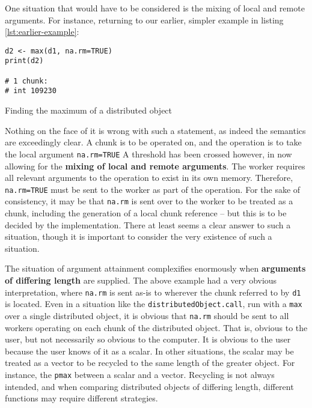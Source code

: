 One situation that would have to be considered is the mixing of local
and remote arguments. For instance, returning to our earlier, simpler
example in listing \cref{lst:earlier-example}:

\begin{listing}
    \begin{verbatim}
d2 <- max(d1, na.rm=TRUE)
print(d2)

# 1 chunk:
# int 109230
    \end{verbatim}
    \caption{Finding the maximum of a distributed object}
    \label{lst:earlier-example}
\end{listing}

Nothing on the face of it is wrong with such a statement, as indeed the
semantics are exceedingly clear. A chunk is to be operated on, and the
operation is to take the local argument \texttt{na.rm=TRUE} A threshold
has been crossed however, in now allowing for the \textbf{mixing of
    local and remote arguments}. The worker requires all relevant arguments
to the operation to exist in its own memory. Therefore,
\texttt{na.rm=TRUE} must be sent to the worker as part of the operation.
For the sake of consistency, it may be that \texttt{na.rm} is sent over
to the worker to be treated as a chunk, including the generation of a
local chunk reference -- but this is to be decided by the
implementation. There at least seems a clear answer to such a situation,
though it is important to consider the very existence of such a
situation.

The situation of argument attainment complexifies enormously when
\textbf{arguments of differing length} are supplied. The above example
had a very obvious interpretation, where \texttt{na.rm} is sent as-is to
wherever the chunk referred to by \texttt{d1} is located. Even in a
situation like the \texttt{distributedObject.call}, run with a
\texttt{max} over a single distributed object, it is obvious that
\texttt{na.rm} should be sent to all workers operating on each chunk of
the distributed object. That is, obvious to the user, but not
necessarily so obvious to the computer. It is obvious to the user
because the user knows of it as a scalar. In other situations, the
scalar may be treated as a vector to be recycled to the same length of
the greater object. For instance, the \texttt{pmax} between a scalar and
a vector. Recycling is not always intended, and when comparing
distributed objects of differing length, different functions may require
different strategies.

